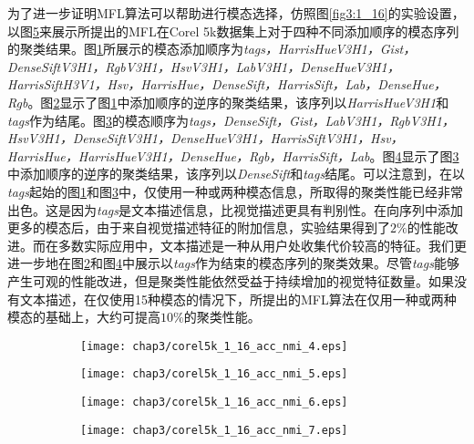 为了进一步证明MFL算法可以帮助进行模态选择，仿照图\ref{fig3:1_16}的实验设置，以图\ref{fig3:1_16_more}来展示所提出的MFL在Corel 5k数据集上对于四种不同添加顺序的模态序列的聚类结果。图\ref{fig3:1_16_acc_nmi_4}所展示的模态添加顺序为\textit{tags，HarrisHueV3H1，Gist，DenseSiftV3H1，RgbV3H1，HsvV3H1，LabV3H1，DenseHueV3H1，HarrisSiftH3V1，Hsv，HarrisHue，DenseSift，HarrisSift，Lab，DenseHue，Rgb}。图\ref{fig3:1_16_acc_nmi_5}显示了图\ref{fig3:1_16_acc_nmi_4}中添加顺序的逆序的聚类结果，该序列以\textit{HarrisHueV3H1}和\textit{tags}作为结尾。图\ref{fig3:1_16_acc_nmi_6}的模态顺序为\textit{tags，DenseSift，Gist，LabV3H1，RgbV3H1，HsvV3H1，DenseSiftV3H1，DenseHueV3H1，HarrisSiftV3H1，Hsv，HarrisHue，HarrisHueV3H1，DenseHue，Rgb，HarrisSift，Lab}。图\ref{fig3:1_16_acc_nmi_7}显示了图\ref{fig3:1_16_acc_nmi_6}中添加顺序的逆序的聚类结果，该序列以\textit{DenseSift}和\textit{tags}结尾。可以注意到，在以\textit{tags}起始的图\ref{fig3:1_16_acc_nmi_4}和图\ref{fig3:1_16_acc_nmi_6}中，仅使用一种或两种模态信息，所取得的聚类性能已经非常出色。这是因为\textit{tags}是文本描述信息，比视觉描述更具有判别性。在向序列中添加更多的模态后，由于来自视觉描述特征的附加信息，实验结果得到了$2\%$的性能改进。而在多数实际应用中，文本描述是一种从用户处收集代价较高的特征。我们更进一步地在图\ref{fig3:1_16_acc_nmi_5}和图\ref{fig3:1_16_acc_nmi_7}中展示以\textit{tags}作为结束的模态序列的聚类效果。尽管\textit{tags}能够产生可观的性能改进，但是聚类性能依然受益于持续增加的视觉特征数量。如果没有文本描述，在仅使用15种模态的情况下，所提出的MFL算法在仅用一种或两种模态的基础上，大约可提高$10\%$的聚类性能。

\begin{figure}[t]
	\centering
	\begin{subfigure}{0.495\textwidth}
		\centering
		\texttt{[image: chap3/corel5k\_1\_16\_acc\_nmi\_4.eps]}
		\caption{}
		\label{fig3:1_16_acc_nmi_4}
	\end{subfigure}
	\begin{subfigure}{0.495\textwidth}
		\centering
		\texttt{[image: chap3/corel5k\_1\_16\_acc\_nmi\_5.eps]}
		\caption{}
		\label{fig3:1_16_acc_nmi_5}
    \end{subfigure}
    
	\centering
	\begin{subfigure}{0.495\textwidth}
		\centering
		\texttt{[image: chap3/corel5k\_1\_16\_acc\_nmi\_6.eps]}
		\caption{}
		\label{fig3:1_16_acc_nmi_6}
	\end{subfigure}
	\begin{subfigure}{0.495\textwidth}
		\centering
		\texttt{[image: chap3/corel5k\_1\_16\_acc\_nmi\_7.eps]}
		\caption{}
		\label{fig3:1_16_acc_nmi_7}
	\end{subfigure}
    \label{fig3:1_16_more}
\end{figure}


